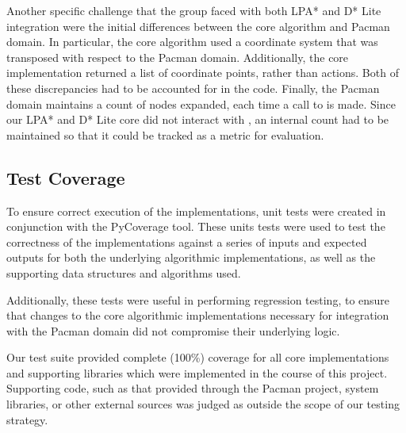 	Another specific challenge that the group faced with both LPA* and D* Lite integration were the initial differences between the core algorithm and Pacman domain. In particular, the core algorithm used a coordinate system that was transposed with respect to the Pacman domain. Additionally, the core implementation returned a list of coordinate points, rather than actions. Both of these discrepancies had to be accounted for in the code. Finally, the Pacman domain maintains a count of nodes expanded, each time a call to  is made. Since our LPA* and D* Lite core did not interact with , an internal count had to be maintained so that it could be tracked as a metric for evaluation. 

\subsection{Test Coverage}

	To ensure correct execution of the implementations, unit tests were created in conjunction with the PyCoverage tool. These units tests were used to test the correctness of the implementations against a series of inputs and expected outputs for both the underlying algorithmic implementations, as well as the supporting data structures and algorithms used.
	
	Additionally, these tests were useful in performing regression testing, to ensure that changes to the core algorithmic implementations necessary for integration with the Pacman domain did not compromise their underlying logic.
	
	Our test suite provided complete (100\%) coverage for all core implementations and supporting libraries which were implemented in the course of this project. Supporting code, such as that provided through the Pacman project, system libraries, or other external sources was judged as outside the scope of our testing strategy.


